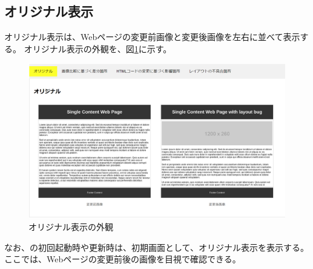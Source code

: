\subsection{オリジナル表示}\label{subsec:original_tab}
オリジナル表示は、Webページの変更前画像と変更後画像を左右に並べて表示する。
オリジナル表示の外観を、図\ref{fig: Appearance_original_tab}に示す。
\begin{figure}[tp]
      \begin{center}
            \includegraphics[width=1.0\columnwidth]{image/3_original_tab2.png}
            \caption{オリジナル表示の外観}
            \label{fig: Appearance_original_tab}
      \end{center}
\end{figure}
なお、\toolName の初回起動時や更新時は、初期画面として、オリジナル表示を表示する。
ここでは、Webページの変更前後の画像を目視で確認できる。

